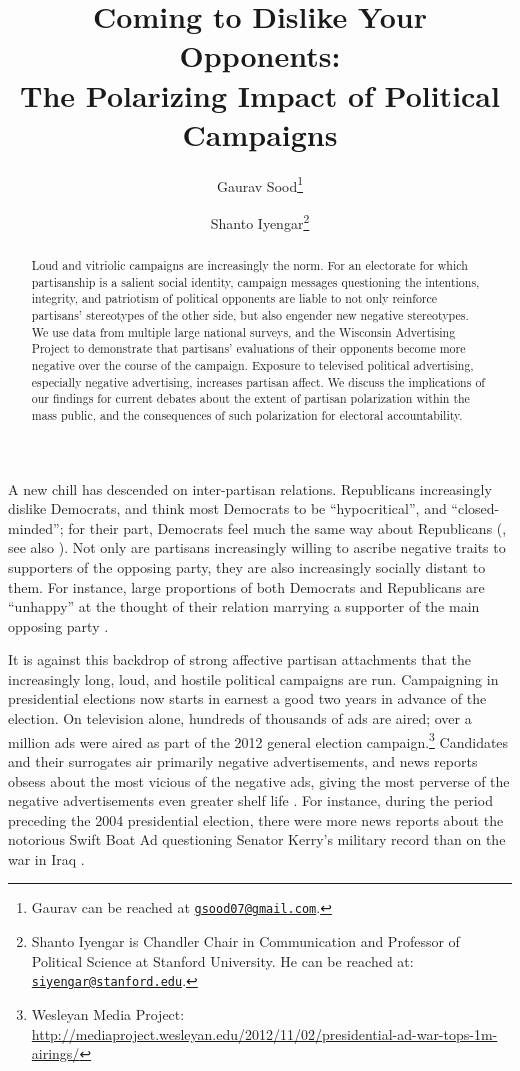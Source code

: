 \documentclass[12pt, letterpaper]{article}
\title{Coming to Dislike Your Opponents:\\The Polarizing Impact of Political Campaigns}
\date{\vspace{-5ex}}
\author{Gaurav Sood\thanks{Gaurav can be reached at \href{mailto:gsood07@gmail.com}{\texttt{gsood07@gmail.com}}.} \and Shanto Iyengar\thanks{Shanto Iyengar is Chandler Chair in Communication and Professor of Political Science at Stanford University. He can be reached at: \href{mailto:siyengar@stanford.edu}{\texttt{siyengar@stanford.edu}}.}}
\begin{document}
\maketitle
\doublespacing
\thispagestyle{empty}
\begin{abstract}
\noindent
Loud and vitriolic campaigns are increasingly the norm. For an electorate for which partisanship is a salient social identity, campaign messages questioning the intentions, integrity, and patriotism of political opponents are liable to not only reinforce partisans' stereotypes of the other side, but also engender new negative stereotypes.  We use data from multiple large national surveys, and the Wisconsin Advertising Project to demonstrate that partisans' evaluations of their opponents become more negative over the course of the campaign. Exposure to televised political advertising, especially negative advertising, increases partisan affect. We discuss the implications of our findings for current debates about the extent of partisan polarization within the mass public, and the consequences of such polarization for electoral accountability.
\end{abstract}

\newpage

A new chill has descended on inter-partisan relations. Republicans increasingly dislike Democrats, and think most Democrats to be ``hypocritical'', and ``closed-minded''; for their part, Democrats feel much the same way about Republicans (\citealt{iyengar2012}, see also \citealt{Iyengar2014, Mason2013}).  Not only are partisans increasingly willing to ascribe negative traits to supporters of the opposing party, they are also increasingly socially distant to them.  For instance, large proportions of both Democrats and Republicans are ``unhappy'' at the thought of their relation marrying a supporter of the main opposing party \citep{iyengar2012}. 

It is against this backdrop of strong affective partisan attachments that the increasingly long, loud, and hostile political campaigns are run. Campaigning in presidential elections now starts in earnest a good two years in advance of the election. On television alone, hundreds of thousands of ads are aired; over a million ads were aired as part of the 2012 general election campaign.\footnote{Wesleyan Media Project: \href{http://mediaproject.wesleyan.edu/2012/11/02/presidential-ad-war-tops-1m-airings/}{http://mediaproject.wesleyan.edu/2012/11/02/presidential-ad-war-tops-1m-airings/}} Candidates and their surrogates air primarily negative advertisements, and news reports obsess about the most vicious of the negative ads, giving the most perverse of the negative advertisements even greater shelf life \citep{geer2010}. For instance, during the period preceding the 2004 presidential election, there were more news reports about the notorious Swift Boat Ad questioning Senator Kerry's military record than on the war in Iraq \citep{geer2010}.
\end{document}
